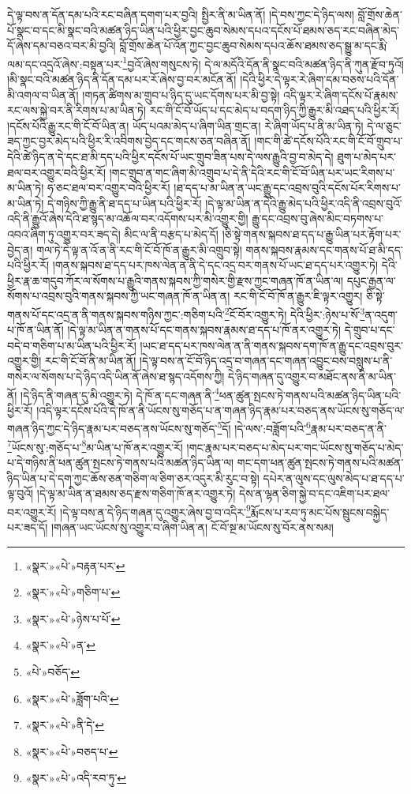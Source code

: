 དེ་ལྟ་བས་ན་དོན་དམ་པའི་རང་བཞིན་དགག་པར་བྱའི། སྤྱིར་ནི་མ་ཡིན་ནོ། །དེ་བས་ཀྱང་དེ་ཉིད་ལས། བློ་གྲོས་ཆེན་པོ་སྣང་བ་དང་མི་སྣང་བའི་མཚན་ཉིད་ཡིན་པའི་ཕྱིར་བྱང་ཆུབ་སེམས་དཔའ་དངོས་པོ་ཐམས་ཅད་རང་བཞིན་མེད་དོ་ཞེས་དམ་བཅའ་བར་མི་བྱའི། བློ་གྲོས་ཆེན་པོ་འོན་ཀྱང་བྱང་ཆུབ་སེམས་དཔའ་ཆོས་ཐམས་ཅད་སྒྱུ་མ་དང་རྨི་ལམ་དང་འདྲའོ་ཞེས་:བསྟན་པར་\footnote{«སྣར་»«པེ་»བརྟན་པར་}བྱའོ་ཞེས་གསུངས་ཏེ། དེ་ལ་མདོའི་དོན་ནི་སྣང་བའི་མཚན་ཉིད་ནི་ཀུན་རྫོབ་ཏུའོ། །མི་སྣང་བའི་མཚན་ཉིད་ནི་དོན་དམ་པར་རོ་ཞེས་བྱ་བར་མངོན་ནོ། །དེའི་ཕྱིར་དེ་ལྟར་རེ་ཞིག་དམ་བཅས་པའི་དོན་མི་འགལ་བ་ཡིན་ནོ། །གཏན་ཚིགས་མ་གྲུབ་པ་ཉིད་དུ་ཡང་དོགས་པར་མི་བྱ་སྟེ། འདི་ལྟར་རེ་ཞིག་དངོས་པོ་རྣམས་རང་ལས་སྐྱེ་བར་ནི་རིགས་པ་མ་ཡིན་ཏེ། རང་གི་ངོ་བོ་ཡོད་པ་དང་མེད་པ་བདག་ཉིད་ཀྱི་རྒྱུར་མི་འཐད་པའི་ཕྱིར་རོ། །དངོས་པོའི་རྒྱུ་རང་གི་ངོ་བོ་ཡིན་ན། ཡོད་པའམ་མེད་པ་ཞིག་ཡིན་གྲང་ན། རེ་ཞིག་ཡོད་པ་ནི་མ་ཡིན་ཏེ། དེ་ལ་ཅུང་ཟད་ཀྱང་བྱར་མེད་པའི་ཕྱིར་རི་འབིགས་བྱེད་དང་གངས་ཅན་བཞིན་ནོ། །གང་གི་ཚེ་དངོས་པོའི་རང་གི་ངོ་བོ་གྲུབ་པ་དེའི་ཚེ་ཉིད་ན་དེ་དང་ཐ་མི་དད་པའི་ཕྱིར་དངོས་པོ་ཡང་གྲུབ་ཟིན་པས་དེ་ལས་རྒྱུའི་བྱ་བ་མེད་དེ། ཐུག་པ་མེད་པར་ཐལ་བར་འགྱུར་བའི་ཕྱིར་རོ། །གང་གྲུབ་ན་གང་ཞིག་མི་འགྲུབ་པ་དེ་ནི་དེའི་རང་གི་ངོ་བོ་ཡིན་པར་ཡང་རིགས་པ་མ་ཡིན་ཏེ། ཧ་ཅང་ཐལ་བར་འགྱུར་བའི་ཕྱིར་རོ། །ཐ་དད་པ་མ་ཡིན་ན་ཡང་རྒྱུ་དང་འབྲས་བུའི་དངོས་པོར་རིགས་པ་མ་ཡིན་ཏེ། དེ་གཉིས་ཀྱི་རྒྱུ་ནི་ཐ་དད་པ་ཡིན་པའི་ཕྱིར་རོ། །དེ་ལྟ་མ་ཡིན་ན་དེའི་རྒྱུ་མེད་པའི་ཕྱིར་འདི་ནི་འབྲས་བུའོ་འདི་ནི་རྒྱུའོ་ཞེས་དེའི་ཐ་སྙད་མ་འཆོལ་བར་འདོགས་པར་མི་འགྱུར་གྱི། རྒྱུ་དང་འབྲས་བུ་ཞེས་མིང་བཏགས་པ་འབའ་ཞིག་ཏུ་འགྱུར་བར་ཟད་དེ། མིང་ལ་ནི་བརྩད་པ་མེད་དོ། །ཅི་སྟེ་གནས་སྐབས་ཐ་དད་པ་རྒྱུ་ཡིན་པར་རྟོག་པར་བྱེད་ན། གལ་ཏེ་དེ་ལྟ་ན་འོ་ན་ནི་རང་གི་ངོ་བོ་ཁོ་ན་རྒྱུར་མི་འགྲུབ་སྟེ། གནས་སྐབས་རྣམས་དང་གནས་པོ་ཐ་མི་དད་པའི་ཕྱིར་རོ། །གནས་སྐབས་ཐ་དད་པར་ཁས་ལེན་ན་ནི་དེ་དང་འདྲ་བར་གནས་པོ་ཡང་ཐ་དད་པར་འགྱུར་ཏེ། དེའི་ཕྱིར་རྣ་ཆ་གདུབ་ཀོར་ལ་སོགས་པ་རྒྱུའི་གནས་སྐབས་ཀྱི་གསེར་གྱི་རྫས་ཀྱང་གཞན་ཁོ་ན་ཡིན་ལ། དཔུང་རྒྱན་ལ་སོགས་པ་འབྲས་བུའི་གནས་སྐབས་ཀྱི་ཡང་གཞན་ཁོ་ན་ཡིན་ན། རང་གི་ངོ་བོ་ཁོ་ན་རྒྱུར་ཇི་ལྟར་འགྱུར། ཅི་སྟེ་གནས་པོ་དང་འདྲ་ན་ནི་གནས་སྐབས་གཉིས་ཀྱང་:གཅིག་པའི་\footnote{«སྣར་»«པེ་»གཅིག་པ་}ངོ་བོར་འགྱུར་ཏེ། དེའི་ཕྱིར་:ཉེས་པ་སོ་\footnote{«སྣར་»«པེ་»ཉེས་པ་པོ་}ན་འདུག་པ་ཁོ་ན་ཡིན་ནོ། །དེ་ལྟ་མ་ཡིན་ན་གནས་པོ་དང་གནས་སྐབས་རྣམས་ཐ་དད་པ་ཁོ་ནར་འགྱུར་ཏེ། དེ་གྲུབ་པ་དང་བདེ་བ་གཅིག་པ་མ་ཡིན་པའི་ཕྱིར་རོ། །ཡང་ཐ་དད་པར་ཁས་ལེན་ན་ནི་གནས་སྐབས་དག་ཁོ་ན་རྒྱུ་དང་འབྲས་བུར་འགྱུར་གྱི། རང་གི་ངོ་བོ་ནི་མ་ཡིན་ནོ། །དེ་ལྟ་བས་ན་ངོ་བོ་ཉིད་འདྲ་བ་གཞན་དང་གཞན་འབྱུང་བས་བསླུས་པ་ནི་གསེར་ལ་སོགས་པ་དེ་ཉིད་འདི་ཡིན་ནོ་ཞེས་ཐ་སྙད་འདོགས་ཀྱི། དེ་ཉིད་གཞན་དུ་འགྱུར་བ་མཐོང་ནས་ནི་མ་ཡིན་ནོ། །དེ་ཉིད་ནི་གཞན་དུ་མི་འགྱུར་ཏེ། དེ་ཁོ་ན་དང་གཞན་ནི་\footnote{«སྣར་»«པེ་»ན་}ཕན་ཚུན་སྤངས་ཏེ་གནས་པའི་མཚན་ཉིད་ཡིན་པའི་ཕྱིར་རོ། །འདི་ལྟར་དངོས་པོའི་དེ་ཁོ་ན་ནི་ཡོངས་སུ་གཅོད་པ་ན་གཞན་ཉིད་རྣམ་པར་བཅད་ནས་ཡོངས་སུ་གཅོད་ལ་གཞན་ཉིད་ཀྱང་དེ་ཉིད་རྣམ་པར་བཅད་ནས་ཡོངས་སུ་གཅོད་\footnote{«པེ་»བཅོད་}དོ། །དེ་ལས་:བཟློག་པའི་\footnote{«སྣར་»«པེ་»ཟློག་པའི་}རྣམ་པར་བཅད་ན་ནི་\footnote{«སྣར་»«པེ་»ནི་དེ་}ཡོངས་སུ་:གཅོད་པ་\footnote{«སྣར་»«པེ་»བཅད་པ་}མ་ཡིན་པ་ཁོ་ནར་འགྱུར་རོ། །གང་རྣམ་པར་བཅད་པ་མེད་པར་གང་ཡོངས་སུ་གཅོད་པ་མེད་པ་དེ་གཉིས་ནི་ཕན་ཚུན་སྤངས་ཏེ་གནས་པའི་མཚན་ཉིད་ཡིན་ལ། གང་དག་ཕན་ཚུན་སྤངས་ཏེ་གནས་པའི་མཚན་ཉིད་ཡིན་པ་དེ་དག་ཀྱང་ཆོས་ཅན་གཅིག་ལ་ཅིག་ཅར་འདུར་མི་རུང་བ་སྟེ། དཔེར་ན་ལུས་དང་ལུས་མེད་པ་ཐ་དད་པ་ལྟ་བུའོ། །དེ་ལྟ་མ་ཡིན་ན་ཐམས་ཅད་རྫས་གཅིག་ཁོ་ནར་འགྱུར་ཏེ། དེས་ན་ལྷན་ཅིག་སྐྱེ་བ་དང་འཇིག་པར་ཐལ་བར་འགྱུར་རོ། །དེ་ལྟ་བས་ན་དེ་ཉིད་གཞན་དུ་འགྱུར་ཞེས་བྱ་བ་འདིར་\footnote{«སྣར་»«པེ་»འདི་རབ་ཏུ་}རྨོངས་པ་རབ་ཏུ་མང་པོས་སྦུངས་བསྐྱེད་པར་ཟད་དོ། །གཞན་ཡང་ཡོངས་སུ་འགྱུར་བ་ཞིག་ཡིན་ན། ངོ་བོ་སྔ་མ་ཡོངས་སུ་བོར་ནས་སམ། 